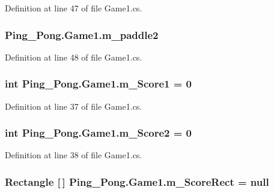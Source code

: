Definition at line 47 of file Game1.\-cs.

\hypertarget{class_ping___pong_1_1_game1_a9735bd7df2c29d6196fbba528689dfa7}{
\subsubsection[{m\-\_\-paddle2}]{ Ping\-\_\-\-Pong.\-Game1.\-m\-\_\-paddle2\hspace{0.3cm}{\ttfamily [private]}}}\label{class_ping___pong_1_1_game1_a9735bd7df2c29d6196fbba528689dfa7}


Definition at line 48 of file Game1.\-cs.

\hypertarget{class_ping___pong_1_1_game1_a79cc64d39546f15bb7c9d169e5482444}{
\subsubsection[{m\-\_\-\-Score1}]{\setlength{\rightskip}{0pt plus 5cm}int Ping\-\_\-\-Pong.\-Game1.\-m\-\_\-\-Score1 = 0\hspace{0.3cm}{\ttfamily [private]}}}\label{class_ping___pong_1_1_game1_a79cc64d39546f15bb7c9d169e5482444}


Definition at line 37 of file Game1.\-cs.

\hypertarget{class_ping___pong_1_1_game1_ad54e91077ec0e426c351258e17fb2137}{
\subsubsection[{m\-\_\-\-Score2}]{\setlength{\rightskip}{0pt plus 5cm}int Ping\-\_\-\-Pong.\-Game1.\-m\-\_\-\-Score2 = 0\hspace{0.3cm}{\ttfamily [private]}}}\label{class_ping___pong_1_1_game1_ad54e91077ec0e426c351258e17fb2137}


Definition at line 38 of file Game1.\-cs.

\hypertarget{class_ping___pong_1_1_game1_a97f485fbb53d7daba3590705a5129e60}{
\subsubsection[{m\-\_\-\-Score\-Rect}]{\setlength{\rightskip}{0pt plus 5cm}Rectangle \mbox{[}$\,$\mbox{]} Ping\-\_\-\-Pong.\-Game1.\-m\-\_\-\-Score\-Rect = null\hspace{0.3cm}{\ttfamily [private]}}}\label{class_ping___pong_1_1_game1_a97f485fbb53d7daba3590705a5129e60}


